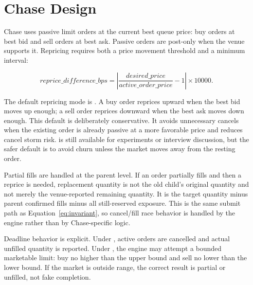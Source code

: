 \section{Chase Design}

Chase uses passive limit orders at the current best queue price: buy orders at best bid and sell orders at best ask. Passive orders are post-only when the venue supports it. Repricing requires both a price movement threshold and a minimum interval:

\begin{equation}
  reprice\_difference\_bps =
  \left|\frac{desired\_price}{active\_order\_price} - 1\right| \times 10000.
\end{equation}

The default repricing mode is . A buy order reprices upward when the best bid moves up enough; a sell order reprices downward when the best ask moves down enough. This default is deliberately conservative. It avoids unnecessary cancels when the existing order is already passive at a more favorable price and reduces cancel storm risk.  is still available for experiments or interview discussion, but the safer default is to avoid churn unless the market moves away from the resting order.

Partial fills are handled at the parent level. If an order partially fills and then a reprice is needed, replacement quantity is not the old child's original quantity and not merely the venue-reported remaining quantity. It is the target quantity minus parent confirmed fills minus all still-reserved exposure. This is the same submit path as Equation~\ref{eq:invariant}, so cancel/fill race behavior is handled by the engine rather than by Chase-specific logic.

Deadline behavior is explicit. Under , active orders are cancelled and actual unfilled quantity is reported. Under , the engine may attempt a bounded marketable limit: buy no higher than the upper bound and sell no lower than the lower bound. If the market is outside range, the correct result is partial or unfilled, not fake completion.
